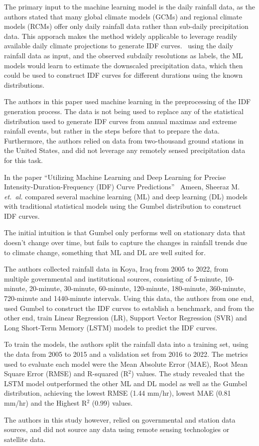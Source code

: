 The primary input to the machine learning model is the daily rainfall data, as the authors stated that many global climate models (GCMs) and regional climate models (RCMs) offer only daily rainfall data rather than sub-daily precipitation data. This apporach makes the method widely applicable to leverage readily available daily climate projections to generate IDF curves.~\cite{geosciences9050209} using the daily rainfall data as input, and the observed subdaily resolutions as labels, the ML models would learn to estimate the downscaled precipitation data, which then could be used to construct IDF curves for different durations using the known distributions.

The authors in this paper used machine learning in the preprocessing of the IDF generation process. The data is not being used to replace any of the statistical distribution used to generate IDF curves from  annual maximas and extreme rainfall events, but rather in the steps before that to prepare the data. Furthermore, the authors relied on data from two-thousand ground stations in the United States, and did not leverage any remotely sensed precipitation data for this task.

\vspace{1em}

In the paper ``Utilizing Machine Learning and Deep Learning for Precise Intensity-Duration-Frequency (IDF) Curve Predictions''~\cite{idfkoya} Ameen, Sheeraz M. \emph{et.~al.} compared several machine learning (ML) and deep learning (DL) models with traditional statistical models using the Gumbel distribution to construct IDF curves.

The initial intuition is that Gumbel only performs well on stationary data that doesn't change over time, but fails to capture the changes in rainfall trends due to climate change, something that ML and DL are well suited for.~\cite{idfkoya}

The authors collected rainfall data in Koya, Iraq from 2005 to 2022, from multiple governmental and institutional sources, consisting of 5-minute, 10-minute, 20-minute, 30-minute, 60-minute, 120-minute, 180-minute, 360-minute, 720-minute and 1440-minute intervals. Using this data, the authors from one end, used Gumbel to construct the IDF curves to establish a benchmark, and from the other end, train Linear Regression (LR), Support Vector Regression (SVR) and Long Short-Term Memory (LSTM) models to predict the IDF curves.~\cite{idfkoya}

To train the models, the authors split the rainfall data into a training set, using the data from 2005 to 2015 and a validation set from 2016 to 2022. The metrics used to evaluate each model were the Mean Absolute Error (MAE), Root Mean Square Error (RMSE) and R-squared (R$^{2}$) values. The study revealed that the LSTM model outperformed the other ML and DL model as well as the Gumbel distribution, achieving the lowest RMSE (1.44 mm/hr), lowest MAE (0.81 mm/hr) and the Highest R$^{2}$ (0.99) values.~\cite{idfkoya}

The authors in this study however, relied on governmental and station data sources, and did not source any data using remote sensing technologies or satellite data.